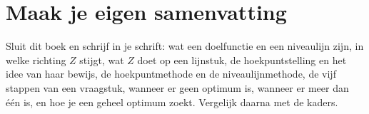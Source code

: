 
\begin{oefeningen}






\end{oefeningen}


\ifzelfstudie
\section*{Maak je eigen samenvatting}
Sluit dit boek en schrijf in je schrift: wat een doelfunctie en een niveaulijn zijn, in welke richting $Z$ stijgt, wat $Z$ doet op een lijnstuk, de hoekpuntstelling en het idee van haar bewijs, de hoekpuntmethode en de niveaulijnmethode, de vijf stappen van een vraagstuk, wanneer er geen optimum is, wanneer er meer dan één is, en hoe je een geheel optimum zoekt. Vergelijk daarna met de kaders.
\fi
